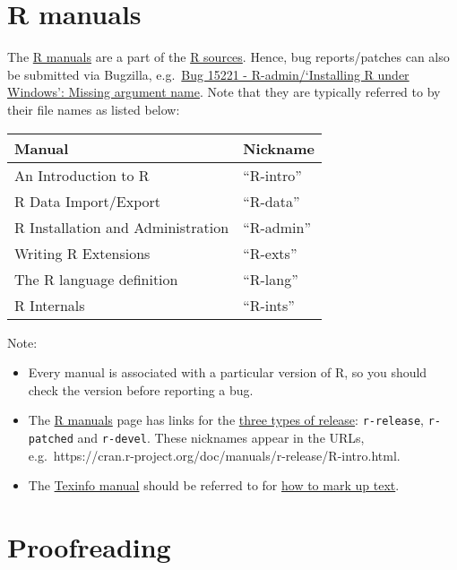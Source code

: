 \documentclass[
  letterpaper,
  DIV=11,
  numbers=noendperiod]{scrreprt}
\providecommand{\tightlist}{%
  \setlength{\itemsep}{0pt}\setlength{\parskip}{0pt}}\usepackage{longtable,booktabs,array}
\begin{document}
\section{R manuals}\label{r-manuals}

The \href{https://cran.r-project.org/manuals.html}{R manuals} are a part
of the \href{https://svn.r-project.org/R/trunk/doc/manual/}{R sources}.
Hence, bug reports/patches can also be submitted via Bugzilla,
e.g.~\href{https://bugs.r-project.org/bugzilla/show_bug.cgi?id=15221}{Bug
15221 - R-admin/`Installing R under Windows': Missing argument name}.
Note that they are typically referred to by their file names as listed
below:

\begin{longtable}[]{@{}ll@{}}
\toprule\noalign{}
Manual & Nickname \\
\midrule\noalign{}
\endhead
\bottomrule\noalign{}
\endlastfoot
An Introduction to R & ``R-intro'' \\
R Data Import/Export & ``R-data'' \\
R Installation and Administration & ``R-admin'' \\
Writing R Extensions & ``R-exts'' \\
The R language definition & ``R-lang'' \\
R Internals & ``R-ints'' \\
\end{longtable}

Note:

\begin{itemize}
\tightlist
\item
  Every manual is associated with a particular version of R, so you
  should check the version before reporting a bug.
\item
  The \href{https://cran.r-project.org/manuals.html}{R manuals} page has
  links for the
  \href{https://contributor.r-project.org/rdevguide/GetStart.html\#the-r-source-code}{three
  types of release}: \texttt{r-release}, \texttt{r-patched} and
  \texttt{r-devel}. These nicknames appear in the URLs,
  e.g.~https://cran.r-project.org/doc/manuals/r-release/R-intro.html.
\item
  The \href{https://www.gnu.org/software/texinfo/}{Texinfo manual}
  should be referred to for
  \href{https://www.gnu.org/software/texinfo/manual/texinfo/texinfo.html}{how
  to mark up text}.
\end{itemize}

\section{Proofreading}\label{proofreading}
\end{document}
